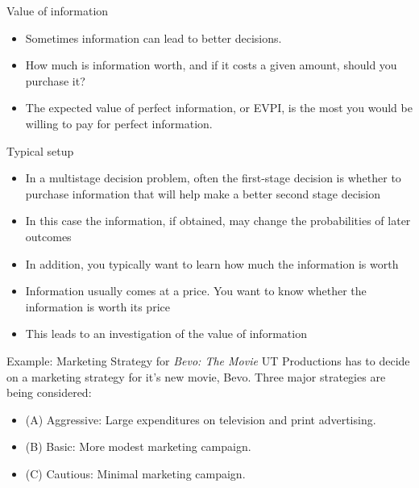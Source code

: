 \documentclass{beamer}\usepackage[]{graphicx}\usepackage[]{color}
\begin{document}
\begin{darkframes}
\begin{frame}[fragile]{Value of information}
        \begin{itemize}[<+->]
            \item Sometimes information can lead to better decisions.
            \item How much is information worth, and if it costs a given amount, should you purchase it?
            \item The expected value of perfect information, or EVPI, is the most you would be willing to pay for perfect information.
        \end{itemize}

     \end{frame}


    \begin{frame}[fragile]{Typical setup}

      \begin{itemize}[<+->]
        \item In a multistage decision problem, often the first-stage decision is whether to purchase information that will help make a better second stage decision
        \item In this case the information, if obtained, may change the probabilities of later outcomes
        \item In addition, you typically want to learn how much the information is worth
        \item Information usually comes at a price.  You want to know whether the information is worth its price
        \item This leads to an investigation of the value of information
        \end{itemize} 

    \end{frame}



    \begin{frame}[fragile]{Example: Marketing Strategy for \emph{Bevo: The Movie}}
      UT Productions has to decide on a marketing strategy for it's new movie, Bevo.  Three major strategies are being considered:
      \begin{itemize} [<+->]
        \item (A) Aggressive: Large expenditures on television and print advertising.
        \item (B) Basic: More modest marketing campaign.
        \item (C) Cautious: Minimal marketing campaign.
      \end{itemize} 
      

\end{frame}
\end{darkframes}
\end{document}
